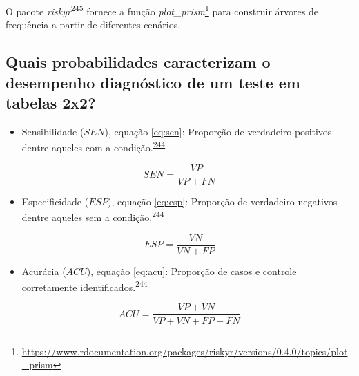 \documentclass[
  a4paper,
]{book}
\providecommand{\tightlist}{%
  \setlength{\itemsep}{0pt}\setlength{\parskip}{0pt}}
\renewcommand{\href}[2]{#2\footnote{\url{#1}}}
\newenvironment{infobox}[1]
  {
  \begin{itemize}
  \renewcommand{\labelitemi}{
    \raisebox{-.7\height}[0pt][0pt]{
      {\setkeys{Gin}{width=3em,keepaspectratio}
        \texttt{[image: \#1]}}
    }
  }
  \setlength{\fboxsep}{1em}
  \begin{blackbox}
  \item
  }
  {
  \end{blackbox}
  \end{itemize}
  }
\begin{document}
\begin{infobox}{images/Rlogo}
O pacote \emph{riskyr}\textsuperscript{\protect\hyperlink{ref-riskyr}{245}} fornece a função \href{https://www.rdocumentation.org/packages/riskyr/versions/0.4.0/topics/plot_prism}{\emph{plot\_prism}} para construir árvores de frequência a partir de diferentes cenários.

\end{infobox}

\hypertarget{quais-probabilidades-caracterizam-o-desempenho-diagnuxf3stico-de-um-teste-em-tabelas-2x2}{%
\subsection{Quais probabilidades caracterizam o desempenho diagnóstico de um teste em tabelas 2x2?}\label{quais-probabilidades-caracterizam-o-desempenho-diagnuxf3stico-de-um-teste-em-tabelas-2x2}}

\begin{itemize}
\tightlist
\item
  Sensibilidade (\(SEN\)), equação \eqref{eq:sen}: Proporção de verdadeiro-positivos dentre aqueles com a condição.\textsuperscript{\protect\hyperlink{ref-greenhalgh1997b}{244}}
\end{itemize}

\begin{equation}
\label{eq:sen}
SEN = \dfrac{VP}{VP+FN}
\end{equation}

\begin{itemize}
\tightlist
\item
  Especificidade (\(ESP\)), equação \eqref{eq:esp}: Proporção de verdadeiro-negativos dentre aqueles sem a condição.\textsuperscript{\protect\hyperlink{ref-greenhalgh1997b}{244}}
\end{itemize}

\begin{equation}
\label{eq:esp}
ESP = \dfrac{VN}{VN+FP}
\end{equation}

\begin{itemize}
\tightlist
\item
  Acurácia (\(ACU\)), equação \eqref{eq:acu}: Proporção de casos e controle corretamente identificados.\textsuperscript{\protect\hyperlink{ref-greenhalgh1997b}{244}}
\end{itemize}

\begin{equation}
\label{eq:acu}
ACU = \dfrac{VP+VN}{VP+VN+FP+FN}
\end{equation}
\end{document}
